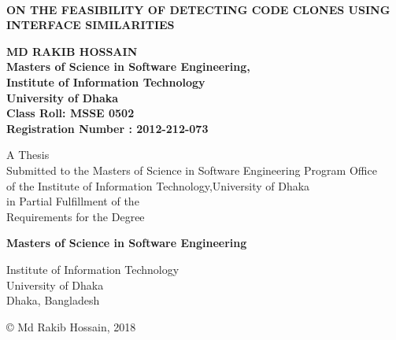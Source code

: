 \thispagestyle{empty}		%

\begin{center}
~
\vspace{2cm}


{\bf ON THE FEASIBILITY OF DETECTING CODE CLONES USING INTERFACE SIMILARITIES}

\vspace{2.5cm}

{\bf MD RAKIB HOSSAIN\\
Masters of Science in Software Engineering,\\
Institute of Information Technology\\University of Dhaka\\
Class Roll: MSSE 0502\\
Registration Number : 2012-212-073

}

\vspace{4cm}

{A Thesis\\
 Submitted to the Masters of Science in Software Engineering Program Office\\
 of the Institute of Information Technology,University of Dhaka\\
 in Partial Fulfillment of the\\
 Requirements for the Degree}

\vspace{5mm}

{\bf Masters of Science in Software Engineering}

\vspace{1.5cm}

{Institute of Information Technology\\
 University of Dhaka\\
 Dhaka, Bangladesh}

\vspace{1.5cm}

{\copyright{} Md Rakib Hossain, 2018}

\end{center}
\clearpage
